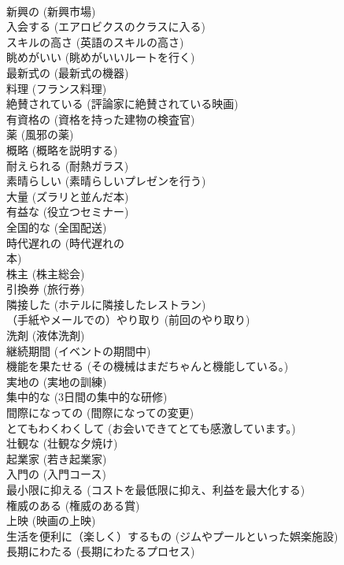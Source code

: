 \documentclass[8pt]{extreport}
\begin{document}
\begin{CJK}{UTF8}{min}
\\	新興の	(新興市場)		
\\	入会する	(エアロビクスのクラスに入る)		
\\	スキルの高さ	(英語のスキルの高さ)		
\\	眺めがいい	(眺めがいいルートを行く)		
\\	最新式の	(最新式の機器)		
\\	料理	(フランス料理)		
\\	絶賛されている	(評論家に絶賛されている映画)		
\\	有資格の	(資格を持った建物の検査官)		
\\	薬	(風邪の薬)		
\\	概略	(概略を説明する)		
\\	耐えられる	(耐熱ガラス)		
\\	素晴らしい	(素晴らしいプレゼンを行う)		
\\	大量	(ズラリと並んだ本)		
\\	有益な	(役立つセミナー)		
\\	全国的な	(全国配送)		
\\	時代遅れの	(時代遅れの
\\	本)		
\\	株主	(株主総会)		
\\	引換券	(旅行券)		
\\	隣接した	(ホテルに隣接したレストラン)		
\\	（手紙やメールでの）やり取り	(前回のやり取り)		
\\	洗剤	(液体洗剤)		
\\	継続期間	(イベントの期間中)		
\\	機能を果たせる	(その機械はまだちゃんと機能している。)		
\\	実地の	(実地の訓練)		
\\	集中的な	(3日間の集中的な研修)		
\\	間際になっての	(間際になっての変更)		
\\	とてもわくわくして	(お会いできてとても感激しています。)		
\\	壮観な	(壮観な夕焼け)		
\\	起業家	(若き起業家)		
\\	入門の	(入門コース)		
\\	最小限に抑える	(コストを最低限に抑え、利益を最大化する)		
\\	権威のある	(権威のある賞)		
\\	上映	(映画の上映)		
\\	生活を便利に（楽しく）するもの	(ジムやプールといった娯楽施設)		
\\	長期にわたる	(長期にわたるプロセス)		

\end{CJK}
\end{document}
